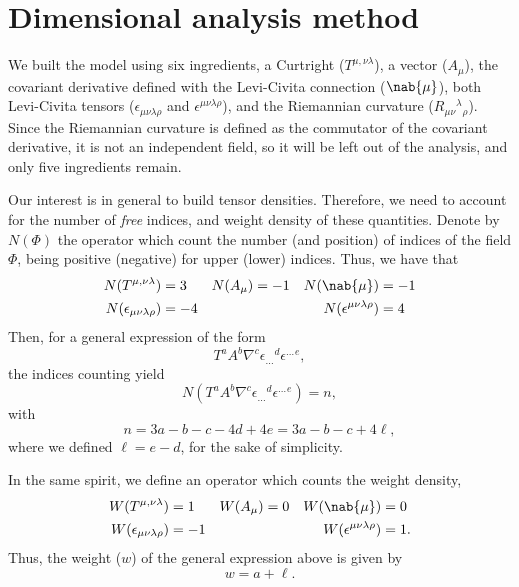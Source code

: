 \section{\label{DA}Dimensional analysis method}

We built the model using six ingredients, a Curtright ($T^{\mu,\nu\lambda}$), a vector ($A_\mu$), the covariant derivative defined with the Levi-Civita connection ($\nab{\mu}$), both Levi-Civita tensors ($\epsilon_{\mu\nu\lambda\rho}$ and $\epsilon^{\mu\nu\lambda\rho}$), and the Riemannian curvature ($R_{\mu\nu}{}^\lambda{}_\rho$).
Since the Riemannian curvature is defined as the commutator of the covariant derivative, it is not an independent field, so it will be left out of the analysis, and only five ingredients remain.

Our interest is in general to build tensor densities. Therefore, we need to account for the number of \emph{free} indices, and weight density of these quantities. Denote by $N(\Phi)$  the operator which count the number (and position) of indices of the field $\Phi$, being positive (negative) for upper (lower) indices. Thus, we have that
\begin{equation*}
  \begin{aligned}
    N( T^{\mu,\nu\lambda} ) &= 3 & N( A_\mu ) &= -1 & N(  \nab{\mu} ) &= -1 \\
    N( \epsilon_{\mu\nu\lambda\rho} ) &= -4 & & & N( \epsilon^{\mu\nu\lambda\rho} ) &= 4 
  \end{aligned}
\end{equation*}
Then, for a general expression of the form
\begin{equation*}
  T^a A^b \nabla^c {\epsilon_{\dots}}^d {\epsilon^{\dots}}^e,
\end{equation*}
the indices counting yield
\begin{equation}
  N( T^a A^b \nabla^c {\epsilon_{\dots}}^d {\epsilon^{\dots}}^e ) = n,
\end{equation}
with
\begin{equation}
  n = 3a -b -c -4d + 4e = 3 a -b - c + 4 \ell,
  \label{ni}
\end{equation}
where we defined $\ell = e - d$, for the sake of simplicity.

In the same spirit, we define an operator which counts the weight density,
\begin{equation*}
  \begin{aligned}
    W( T^{\mu,\nu\lambda} ) &= 1 & W( A_\mu ) &= 0 & W(  \nab{\mu} ) &= 0 \\
    W( \epsilon_{\mu\nu\lambda\rho} ) &= -1 & & & W( \epsilon^{\mu\nu\lambda\rho} ) &= 1 .
  \end{aligned}
\end{equation*}
Thus, the weight ($w$) of the general expression above is given by
\begin{equation}
  w = a + \ell.
  \label{wd}
\end{equation}

